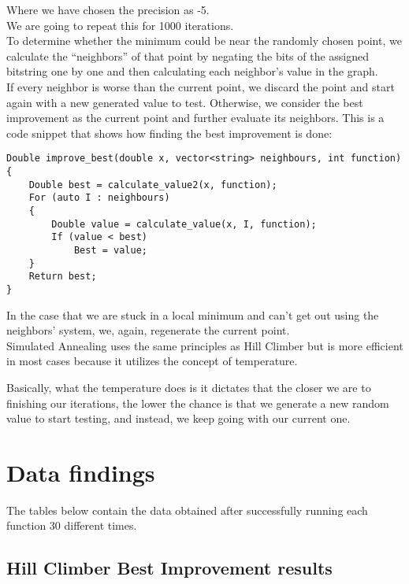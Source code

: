 \documentclass{article}
\begin{document}
Where we have chosen the precision as -5. \\
We are going to repeat this for 1000 iterations. \\
To determine whether the minimum could be near the randomly chosen point, we calculate the “neighbors” of that point by negating the bits of the assigned bitstring one by one and then calculating each neighbor’s value in the graph.\\

If every neighbor is worse than the current point, we discard the point and start again with a new generated value to test. Otherwise, we consider the best improvement as the current point and further evaluate its neighbors. This is a code snippet that shows how finding the best improvement is done:

\begin{lstlisting}[style=cppstyle, caption={}, label={your-label}]
Double improve_best(double x, vector<string> neighbours, int function)
{
    Double best = calculate_value2(x, function);
    For (auto I : neighbours)
    {
        Double value = calculate_value(x, I, function);
        If (value < best)
            Best = value;
    }
    Return best;
}
\end{lstlisting}

In the case that we are stuck in a local minimum and can’t get out using the neighbors’ system, we, again, regenerate the current point. \\
Simulated Annealing uses the same principles as Hill Climber but is more efficient in most cases because it utilizes the concept of temperature. 

Basically, what the temperature does is it dictates that the closer we are to finishing our iterations, the lower the chance is that we generate a new random value to start testing, and instead, we keep going with our current one.

\newpage
\section{Data findings}
The tables below contain the data obtained after successfully running each function 30 different times.
\subsection{Hill Climber Best Improvement results}
\end{document}
